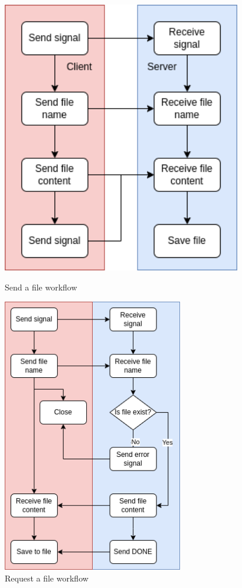 \documentclass{article}
\begin{document}
\begin{figure}[H]
  \centering
  \begin{minipage}{0.45\textwidth}
      \centering
      \includegraphics[width=0.93\textwidth]{SEND_A_FILE.drawio.png} %
      \caption{Send a file workflow}
  \end{minipage}\hfill
  \begin{minipage}{0.45\textwidth}
      \centering
      \includegraphics[width=0.7\textwidth]{REQUEST_A_FILE.drawio.png} %
      \caption{Request a file workflow}
  \end{minipage}
\end{figure}
\end{document}
